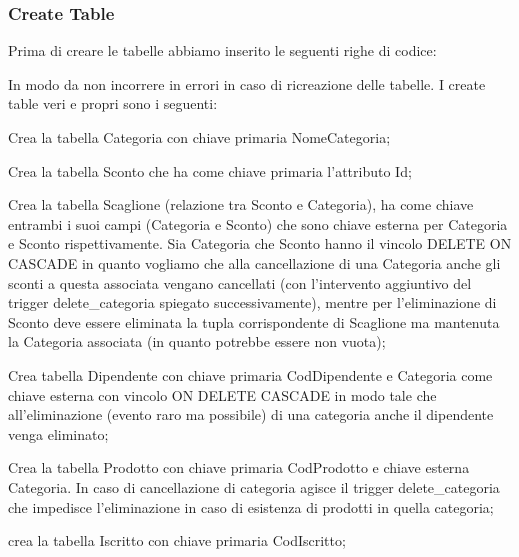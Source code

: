 \subsubsection{Create Table}
Prima di creare le tabelle abbiamo inserito le seguenti righe di codice:


In modo da non incorrere in errori in caso di ricreazione delle tabelle. \newline
I create table veri e propri sono i seguenti:


Crea la tabella Categoria con chiave primaria NomeCategoria;


Crea la tabella Sconto che ha come chiave primaria l'attributo Id;


Crea la tabella Scaglione (relazione tra Sconto e Categoria), ha come chiave entrambi i suoi campi (Categoria e Sconto) che sono chiave esterna per Categoria e Sconto rispettivamente. Sia Categoria che Sconto hanno il vincolo DELETE ON CASCADE in quanto vogliamo che alla cancellazione di una Categoria anche gli sconti a questa associata vengano cancellati (con l'intervento aggiuntivo del trigger delete\_categoria spiegato successivamente), mentre per l'eliminazione di Sconto deve essere eliminata la tupla corrispondente di Scaglione ma mantenuta la Categoria associata (in quanto potrebbe essere non vuota);


Crea tabella Dipendente con chiave primaria CodDipendente e Categoria come chiave esterna con vincolo ON DELETE CASCADE in modo tale che all'eliminazione (evento raro ma possibile) di una categoria anche il dipendente venga eliminato;


Crea la tabella Prodotto con chiave primaria CodProdotto e chiave esterna Categoria. In caso di cancellazione di categoria agisce il trigger delete\_categoria che impedisce l'eliminazione in caso di esistenza di prodotti in quella categoria;


crea la tabella Iscritto con chiave primaria CodIscritto;

